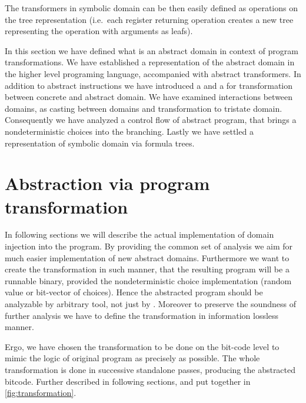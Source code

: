 The transformers in symbolic domain can be then easily defined as operations on
the tree representation (i.e.~each register returning operation creates a new
tree representing the operation with arguments as leafs).

\begin{summary}
In this section we have defined what is an abstract domain in context of program
transformations. We have established a representation of the abstract domain in
the higher level programing language, accompanied with abstract transformers. In
addition to abstract \LLVM instructions we have introduced a  and a
 for transformation between concrete and abstract domain. We have
examined interactions between domains, as casting between domains and
transformation to tristate domain. Consequently we have analyzed a control flow
of abstract program, that brings a nondeterministic choices into the
branching. Lastly we have settled a representation of symbolic domain via formula
trees.
\end{summary}

\section{Abstraction via program transformation}

In following sections we will describe the actual implementation of domain
injection into the program. By providing the common set of analysis we aim for
much easier implementation of new abstract domains. Furthermore we want to
create the transformation in such manner, that the resulting program will be a
runnable binary, provided the nondeterministic choice implementation (random
value or bit-vector of choices). Hence the abstracted program should be
analyzable by arbitrary tool, not just by \DIVINE. Moreover to preserve
the soundness of further analysis we have to define the transformation in
information lossless manner.

Ergo, we have chosen the transformation to be done on the \LLVM bit-code level to
mimic the logic of original program as precisely as possible. The whole
transformation is done in successive standalone \LLVM passes, producing the
abstracted \LLVM bitcode. Further described in following sections, and put
together in \autoref{fig:transformation}.

